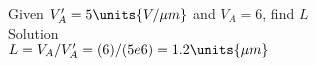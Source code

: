 Given \mbox{$V_A'=\mbox{$5 \units{ V/\mu m}$}$} and \mbox{$V_{A}=6$}, find $L$ \\
Solution\\
\mbox{$L=V_{A}/V_A'  = (6)/(5e6) = \mbox{$1.2 \units{\mu m}$}$}\\

